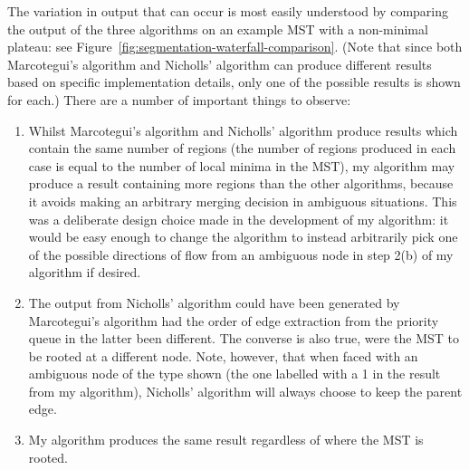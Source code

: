 The variation in output that can occur is most easily understood by comparing the output of the three algorithms on an example MST with a non-minimal plateau: see Figure~\ref{fig:segmentation-waterfall-comparison}. (Note that since both Marcotegui's algorithm and Nicholls' algorithm can produce different results based on specific implementation details, only one of the possible results is shown for each.) There are a number of important things to observe:
%
\begin{enumerate}

\item Whilst Marcotegui's algorithm and Nicholls' algorithm produce results which contain the same number of regions (the number of regions produced in each case is equal to the number of local minima in the MST), my algorithm may produce a result containing more regions than the other algorithms, because it avoids making an arbitrary merging decision in ambiguous situations. This was a deliberate design choice made in the development of my algorithm: it would be easy enough to change the algorithm to instead arbitrarily pick one of the possible directions of flow from an ambiguous node in step 2(b) of my algorithm if desired.

\item The output from Nicholls' algorithm could have been generated by Marcotegui's algorithm had the order of edge extraction from the priority queue in the latter been different. The converse is also true, were the MST to be rooted at a different node. Note, however, that when faced with an ambiguous node of the type shown (the one labelled with a 1 in the result from my algorithm), Nicholls' algorithm will always choose to keep the parent edge.

\item My algorithm produces the same result regardless of where the MST is rooted.

\end{enumerate}

